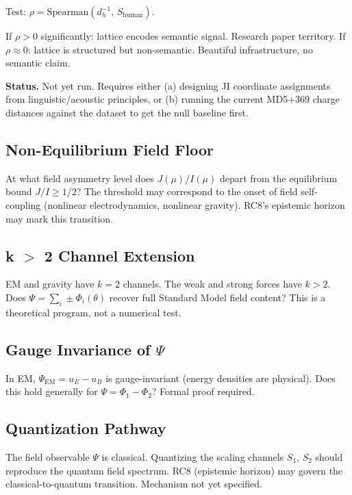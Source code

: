 \documentclass[11pt,twoside]{article}
\begin{document}
Test: $\rho = \mathrm{Spearman}(d_h^{-1},\, S_{\text{human}})$.

If $\rho > 0$ significantly: lattice encodes semantic signal. Research paper territory.
If $\rho \approx 0$: lattice is structured but non-semantic. Beautiful infrastructure, no semantic claim.

\begin{pendingenv}
\textbf{Status.} Not yet run. Requires either (a) designing JI coordinate assignments
from linguistic/acoustic principles, or (b) running the current MD5+369 charge distances
against the dataset to get the null baseline first.
\end{pendingenv}

\subsection{Non-Equilibrium Field Floor}

At what field asymmetry level does $J(\mu)/I(\mu)$ depart from the equilibrium bound
$J/I \geq 1/2$? The threshold may correspond to the onset of field self-coupling
(nonlinear electrodynamics, nonlinear gravity). RC8's epistemic horizon may mark
this transition.

\subsection{k $>$ 2 Channel Extension}

EM and gravity have $k=2$ channels. The weak and strong forces have $k>2$.
Does $\Psi = \sum_i \pm\Phi_i(\theta)$ recover full Standard Model field content?
This is a theoretical program, not a numerical test.

\subsection{Gauge Invariance of $\Psi$}

In EM, $\Psi_{\text{EM}} = u_E - u_B$ is gauge-invariant (energy densities are physical).
Does this hold generally for $\Psi = \Phi_1 - \Phi_2$? Formal proof required.

\subsection{Quantization Pathway}

The field observable $\Psi$ is classical. Quantizing the scaling channels $S_1$, $S_2$
should reproduce the quantum field spectrum. RC8 (epistemic horizon) may govern the
classical-to-quantum transition. Mechanism not yet specified.
\end{document}
